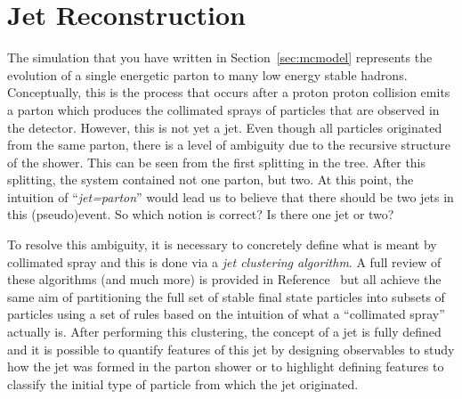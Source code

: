 \documentclass[UKenglish,texlive=2016]{\ATLASLATEXPATH atlasdoc}
\begin{document}
\section{Jet Reconstruction}
\label{sec:jetrec}
The simulation that you have written in Section~\ref{sec:mcmodel} represents the evolution of a single energetic parton to many low energy stable hadrons.  Conceptually, this is the process that occurs after a proton proton collision emits a parton which produces the collimated sprays of particles that are observed in the detector.  However, this is not yet a jet.  Even though all particles originated from the same parton, there is a level of ambiguity due to the recursive structure of the shower.  This can be seen from the first splitting in the tree.  After this splitting, the system contained not one parton, but two.  At this point, the intuition of ``\textit{jet=parton}'' would lead us to believe that there should be two jets in this (pseudo)event.  So which notion is correct?  Is there one jet or two?

To resolve this ambiguity, it is necessary to concretely define what is meant by collimated spray and this is done via a \textit{jet clustering algorithm}.  A full review of these algorithms (and much more) is provided in Reference~\cite{Ellis:2007ib} but all achieve the same aim of partitioning the full set of stable final state particles into subsets of particles using a set of rules based on the intuition of what a ``collimated spray'' actually is.  After performing this clustering, the concept of a jet is fully defined and it is possible to quantify features of this jet by designing observables to study how the jet was formed in the parton shower or to highlight defining features to classify the initial type of particle from which the jet originated.
\end{document}
